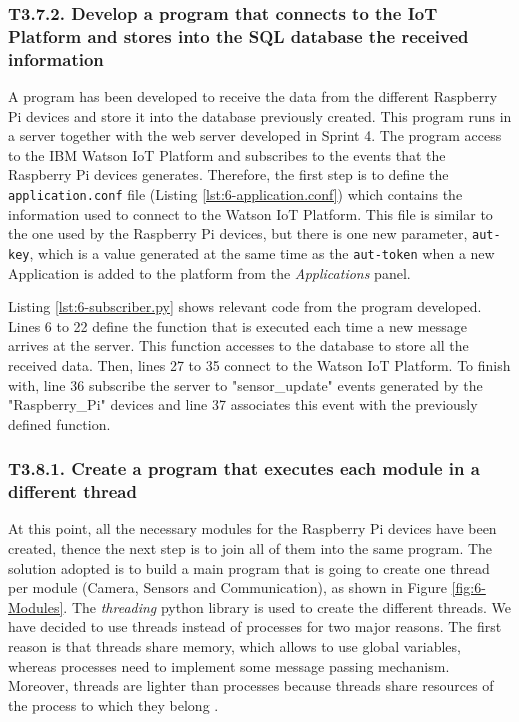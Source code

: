 \subsubsection{T3.7.2. Develop a program that connects to the IoT Platform and stores into the SQL database the received information}

A program has been developed to receive the data from the different Raspberry Pi devices and store it into the database previously created. This program runs in a server together with the web server developed in Sprint 4. The program access to the IBM Watson IoT Platform and subscribes to the events that the Raspberry Pi devices generates. Therefore, the first step is to define the \texttt{application.conf} file (Listing \ref{lst:6-application.conf}) which contains the information used to connect to the Watson IoT Platform. This file is similar to the one used by the Raspberry Pi devices, but there is one new parameter, \texttt{aut-key}, which is a value generated at the same time as the \texttt{aut-token} when a new Application is added to the platform from the \textit{Applications} panel.

 


Listing \ref{lst:6-subscriber.py} shows relevant code from the program developed. Lines 6 to 22 define the function that is executed each time a new message arrives at the server. This function accesses to the database to store all the received data. Then, lines 27 to 35 connect to the Watson IoT Platform. To finish with, line 36 subscribe the server to "sensor\_update" events generated by the "Raspberry\_Pi" devices and line 37 associates this event with the previously defined function.




\subsubsection{T3.8.1. Create a program that executes each module in a different thread}

At this point, all the necessary modules for the Raspberry Pi devices have been created,  thence the next step is to join all of them into the same program. The solution adopted is to build a main program that is going to create one thread per module (Camera, Sensors and Communication), as shown in Figure \ref{fig:6-Modules}. The \textit{threading} python library is used to create the different threads. We have decided to use threads instead of processes for two major reasons. The first reason is that threads share memory, which allows to use global variables, whereas processes need to implement some message passing mechanism. Moreover, threads are lighter than processes because threads share resources of the process to which they belong \cite{SGG06}.

